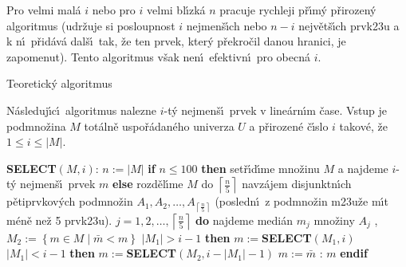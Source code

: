 \flushpar Pro velmi mal\'a $i$ nebo pro $i$ velmi bl\'\i zk\'a $n$ 
pracuje rychleji p\v r\'\i m\'y p\v rirozen\'y algoritmus (udr\v zuje si 
posloupnost $i$ nejmen\-\v s\'\i ch nebo $n-i$ nejv\v et\v s\'\i ch 
prvk\accent23u a k n\'\i\ p\v rid\'av\'a dal\v s\'\i\ tak, \v ze ten 
prvek, kter\'y p\v re\-kro\v cil danou hranici, je zapomenut). Tento algoritmus v\v sak nen\'\i\ efektivn\'\i\ pro obecn\'a $i$. 
\medskip

\subhead
Teoretick\'y algoritmus
\endsubhead
\smallskip

\flushpar N\'asleduj\'\i c\'\i\ algoritmus nalezne $i$-t\'y nejmen\v s\'\i\ 
prvek v line\'arn\'\i m \v case.  Vstup je podmno\v zina $M$ tot\'aln\v e 
uspo\v r\'adan\'eho univerza $U$ a p\v rirozen\'e \v c\'\i slo $i$ takov\'e, \v ze 
$1\le i\le |M|$.  
\medskip

{\bf SELECT$\left(M,i\right)$}:\newline 
$n:=|M|$\newline 
{\bf if} $n\le 100$ {\bf then}\newline 
\phantom{---}set\v r\'\i d\'\i me mno\v zinu $M$ a najdeme $i$-t\'y 
nejmen\v s\'\i\ prvek $m$\newline 
{\bf else}\newline
\phantom{---}rozd\v el\'\i me $M$ do $\left\lceil\frac n5\right\rceil$ navz\'ajem disjunktn\'\i ch p\v etiprvko\-v\'ych podmno\v zin\newline 
\phantom{---}$A_1,A_2,\dots,A_{\left\lceil\frac n5\right\rceil}$ (posledn\'\i\ z 
podmno\v zin m\accent23u\v ze m\'\i t m\'en\v e ne\v z 5 prvk\accent23u).\newline 
\phantom{---}{\bf for every} $j=1,2,\dots,\left\lceil\frac n5\right\rceil$ {\bf do}\newline 
\phantom{------}najdeme medi\'an $m_j$ mno\v ziny $A_j$\newline 
{}, $M_2:=\left\{m\in M\mid\bar {m}<m\right\}$\newline 
\phantom{---}{\bf if} $|M_1|>i-1$ {\bf then}\newline 
\phantom{------}$m:=${\bf SELECT}$\left(M_1,i\right)$\newline 
\phantom{---}{\bf else}\newline 
\phantom{------}{\bf if} $|M_1|<i-1$ {\bf then}\newline 
\phantom{---------}$m:=${\bf SELECT}$\left(M_2,i-|M_1|-1\right)$\newline 
\phantom{------}{\bf else}\newline 
\phantom{---------}$m:=\bar {m}$\newline 
\phantom{------}{\bf endif}\newline 
\phantom{---}{\bf endif}\newline 
\phantom{---}{\bf V\'ystup}: $m$\newline 
{\bf endif}
\medskip

